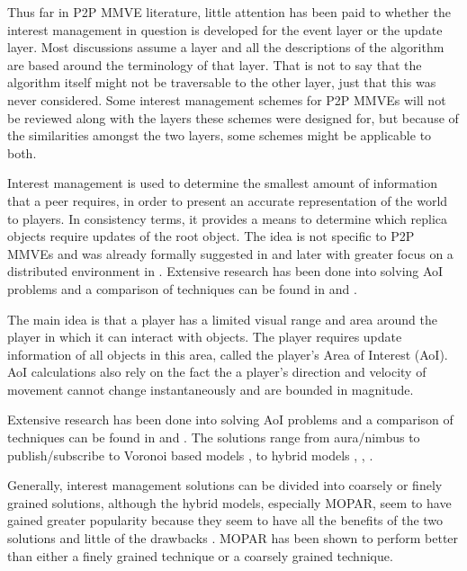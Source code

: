 Thus far in P2P MMVE literature, little attention has been paid to whether the interest management in question is developed for the event layer or the update layer. Most discussions assume a layer and all the descriptions of the algorithm are based around the terminology of that layer. That is not to say that the algorithm itself might not be traversable to the other layer, just that this was never considered. Some interest management schemes for P2P MMVEs will not be reviewed along with the layers these schemes were designed for, but because of the similarities amongst the two layers, some schemes might be applicable to both.

Interest management is used to determine the smallest amount of information that a peer requires, in order to present an accurate representation of
the world to players. In consistency terms, it provides a means to determine which replica objects require updates of the root object. The idea is
not specific to P2P MMVEs and was already formally suggested in \cite{First_IM} and later with greater focus on a distributed environment in \cite{Whang_agent_based_IM}. Extensive research has been done into solving AoI problems and a comparison of techniques can be found in
\cite{Boulanger_IM_compare} and \cite{IM_and_ED_survey_Krause}.

The main idea is that a player has a limited visual range and area around the player in which it can interact with objects. The player requires
update information of all objects in this area, called the player's Area of Interest (AoI). AoI calculations also rely on the fact the a player's
direction and velocity of movement cannot change instantaneously and are bounded in magnitude.

Extensive research has been done into solving AoI problems and a comparison of techniques can be found in \cite{Boulanger_IM_compare} and
\cite{IM_and_ED_survey_Krause}. The solutions range from aura/nimbus \cite{Benford_spatial_IM} to publish/subscribe  \cite{mercury_publish_subscribe} to Voronoi based models \cite{Hu_voronoi_IM},  \cite{Buyukkaya_voronoi_state_management} to hybrid models \cite{hybrid_IM}, \cite{MOPAR}, \cite{fan_mediator_paper}.

Generally, interest management solutions can be divided into coarsely or finely grained solutions, although the hybrid models, especially MOPAR, seem to have gained greater popularity because they seem to have all the benefits of the two solutions and little of the drawbacks \cite{MOPAR}. MOPAR has
been shown to perform better than either a finely grained technique or a coarsely grained technique.

